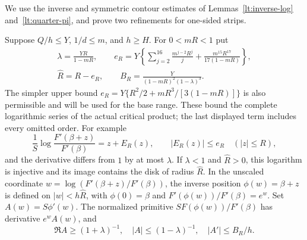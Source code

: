 We use the inverse and symmetric contour estimates of
Lemmas~\ref{lt:inverse-log} and~\ref{lt:quarter-pi},
and prove two refinements for one-sided strips.

Suppose $Q/h\le Y$, $1/d\le m$, and $h\ge H$.  For $0<mR<1$ put
\begin{equation}\label{or:inverse-parameters}
 \begin{gathered}
 \lambda=\frac{YR}{1-mR},\qquad
 e_R=Y\left\{\sum_{j=2}^{16}\frac{m^{j-2}R^j}{j}
                  +\frac{m^{15}R^{17}}{17(1-mR)}\right\},\\
 \widehat R=R-e_R,\qquad
 B_R=\frac{Y}{(1-mR)^2(1-\lambda)^3}.
 \end{gathered}
\end{equation}
The simpler upper bound
$e_R=Y\{R^2/2+mR^3/[3(1-mR)]\}$ is also permissible and will be
used for the base range.  These bound the complete logarithmic series
of the actual critical product; the last displayed term includes
every omitted order.  For example
\[
 \frac1S\log\frac{F'(\beta+z)}{F'(\beta)}=z+E_R(z),\qquad
 |E_R(z)|\le e_R\quad(|z|\le R),
\]
and the derivative differs from $1$ by at most $\lambda$.
If $\lambda<1$ and $\widehat R>0$, this logarithm is injective and
its image contains the disk of radius $\widehat R$.
In the unscaled coordinate
$w=\log(F'(\beta+z)/F'(\beta))$, the inverse position
$\phi(w)=\beta+z$ is defined on $|w|<h\widehat R$, with
$\phi(0)=\beta$ and $F'(\phi(w))/F'(\beta)=e^w$.
Set $A(w)=S\phi'(w)$.  The normalized primitive
$SF(\phi(w))/F'(\beta)$ has derivative $e^w A(w)$, and
\[
        \Re A\ge(1+\lambda)^{-1},\quad
        |A|\le(1-\lambda)^{-1},\quad |A'|\le B_R/h.
\]

